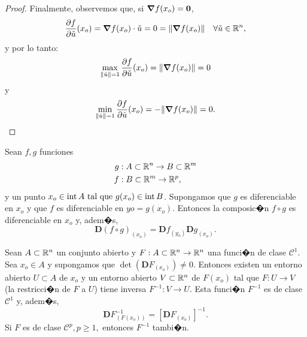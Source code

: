 \documentclass[a4paper]{scrartcl} %
\begin{document}
\begin{theorem}
\begin{proof}
Finalmente, observemos que, si $\grad f(x_o) = \mathbf{0}$, 
\[
 \frac{\partial f}{\partial \check{u}} (x_o) = \grad f (x_o) \cdot \check{u} = 0 = \norm{\grad f(x_o)} \quad \forall \check{u} \in \mathbb{R}^n,
\]
y por lo tanto:
\[
 \max_{\norm{\check{u}}=1} \frac{\partial f}{\partial \check{u}} (x_o) = \norm{\grad f(x_o)} = 0
\]
y
\[
 \min_{\norm{\check{u}}=1} \frac{\partial f}{\partial \check{u}} (x_o) = -\norm{\grad f(x_o)} = 0.
\]

\end{proof}

\end{theorem}

\begin{theorem} \label{teo:cadena}
\mbox{}

  Sean $f, g$ funciones 
    \begin{align*}
    g &:A \subset \mathbb{R}^n \to B \subset \mathbb{R}^m \\
    f &:B \subset \mathbb{R}^m \to \mathbb{R}^p,
    \end{align*}
  y un punto $x_o \in \operatorname{int}{A} \text{ tal que } g(x_o) \in \operatorname{int}{B}$. Supongamos que $g$ es diferenciable en $x_o$ y que $f$ es diferenciable en $yo = g(x_o)$. Entonces la composic�n $f \circ g$ es diferenciable en $x_o$ y, adem�s,
  \[
   \boldsymbol{D}(f \circ g)_{(x_o)} = \boldsymbol{D}f_{(y_o)} 
   \boldsymbol{D}g_{(x_o)}.
  \]
\end{theorem}

\begin{theorem} \label{teo:inversa}
\mbox{}

 Sean $A \subset \mathbb{R}^n$ un conjunto abierto y $F: A \subset \mathbb{R}^n \to \mathbb{R}^n$ una funci�n de clase $\mathcal{C}^1$. Sea $x_o \in A$ y supongamos que $\det(\boldsymbol{D}F_{(x_o)}) \ne 0$. Entonces existen un entorno abierto $U \subset A$ de $x_o$ y un entorno abierto $V \subset \mathbb{R}^n$ de $F(x_o)$ tal que $F:U \to V$ (la restricci�n de $F$ a $U$) tiene inversa $F^{-1}:V \to U$. Esta funci�n $F^{-1}$ es de clase $\mathcal{C}^1$ y, adem�s,
 \[
  \boldsymbol{D}F^{-1}_{(F(x_o))} = \left[ \boldsymbol{D}F_{(x_o)} \right]^{-1}.
 \]
 Si $F$ es de clase $\mathcal{C}^p, p \ge 1,$ entonces $F^{-1}$ tambi�n.
\end{theorem}
\end{document}
